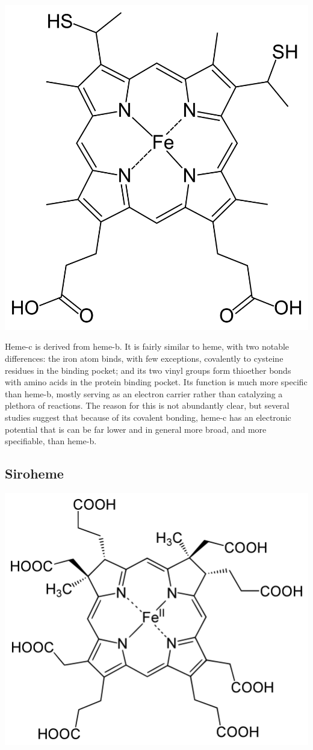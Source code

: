 \documentclass[a4paper, nobind]{templates/ociamthesis}
\let\origfigure\figure
\let\endorigfigure\endfigure
\renewenvironment{figure}[1][2] {
    \expandafter\origfigure\expandafter[H]
} {
    \endorigfigure
}
\begin{document}
\begin{figure}

{\centering \includegraphics[width=0.5\linewidth]{figures/HEC} 

}

\caption{Heme-c (HEC)}\label{fig:structHEC}
\end{figure}

Heme-c is derived from heme-b. It is fairly similar to heme, with two notable differences: the iron atom binds, with few exceptions, covalently to cysteine residues in the binding pocket; and its two vinyl groups form thioether bonds with amino acids in the protein binding pocket. Its function is much more specific than heme-b, mostly serving as an electron carrier rather than catalyzing a plethora of reactions. The reason for this is not abundantly clear, but several studies suggest that because of its covalent bonding, heme-c has an electronic potential that is can be far lower and in general more broad, and more specifiable, than heme-b. \autocite{Bowman2008,Kleingardner2015}

\hypertarget{siroheme}{%
\subsection{Siroheme}\label{siroheme}}

\begin{figure}

{\centering \includegraphics[width=0.5\linewidth]{figures/SRM} 

}

\caption{Siroheme (SRM)}\label{fig:structSRM}
\end{figure}
\end{document}

